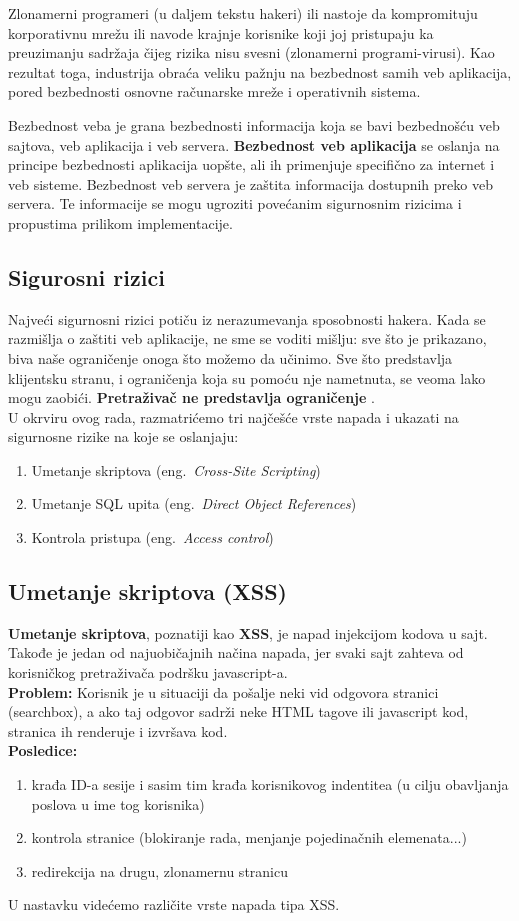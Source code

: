 \documentclass[a4paper]{article}
\begin{document}
Zlonamerni programeri (u daljem tekstu hakeri) ili nastoje da kompromituju korporativnu mrežu ili navode krajnje korisnike koji joj pristupaju ka preuzimanju sadržaja čijeg rizika nisu svesni (zlonamerni programi-virusi). Kao rezultat toga, industrija obraća veliku pažnju na bezbednost samih veb aplikacija, pored bezbednosti osnovne računarske mreže i operativnih sistema.

Bezbednost veba je grana bezbednosti informacija koja se bavi bezbednošću veb sajtova, veb aplikacija i veb servera. \textbf{Bezbednost veb aplikacija} se oslanja na principe bezbednosti aplikacija uopšte, ali ih primenjuje specifično za internet i veb sisteme.
Bezbednost veb servera je zaštita informacija dostupnih preko veb servera. Te informacije se mogu ugroziti povećanim sigurnosnim rizicima i propustima prilikom implementacije.

\subsection{Sigurosni rizici}

Najveći sigurnosni rizici potiču iz nerazumevanja sposobnosti hakera. Kada se razmišlja o zaštiti veb aplikacije, ne sme se voditi mišlju: sve što je prikazano, biva naše ograničenje onoga što možemo da učinimo. Sve što predstavlja klijentsku stranu, i ograničenja koja su pomoću nje nametnuta, se veoma lako mogu zaobići.
\textbf{Pretraživač ne predstavlja ograničenje }.\\
U okrviru ovog rada, razmatrićemo tri najčešće vrste napada i ukazati na sigurnosne rizike na koje se oslanjaju:
\begin{enumerate}
	\item Umetanje skriptova (eng.~{\em Cross-Site Scripting})
	\item Umetanje SQL upita (eng.~{\em Direct Object References})
	\item Kontrola pristupa (eng.~{\em Access control})
\end{enumerate}
\subsection{Umetanje skriptova (XSS)}
\textbf{Umetanje skriptova}, poznatiji kao \textbf{XSS}\cite{XSS}, je napad injekcijom kodova u sajt. Takođe je jedan od najuobičajnih načina napada, jer svaki sajt zahteva od korisničkog pretraživača podršku javascript-a.\\
\textbf{Problem:} Korisnik je u situaciji da pošalje neki vid odgovora stranici (searchbox), a ako taj odgovor sadrži neke HTML tagove ili javascript kod, stranica ih renderuje i izvršava kod.\\
\textbf{Posledice:}
\begin{enumerate}
	\item krađa ID-a sesije i sasim tim krađa korisnikovog indentitea (u cilju obavljanja poslova u ime tog korisnika)
	\item kontrola stranice (blokiranje rada, menjanje pojedinačnih elemenata...)
	\item redirekcija na drugu, zlonamernu stranicu
\end{enumerate}
U nastavku videćemo različite vrste napada tipa XSS.
\end{document}
